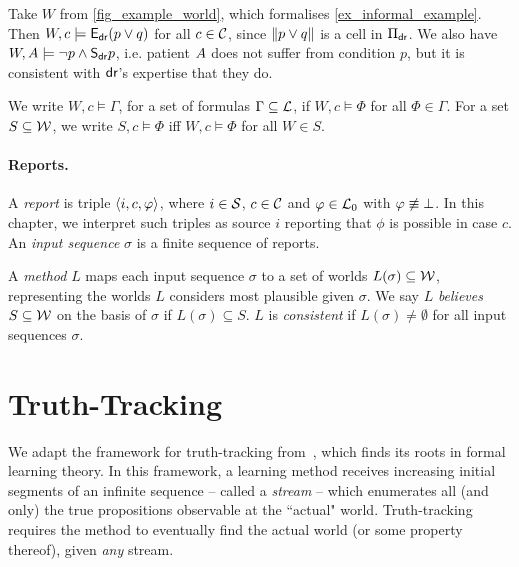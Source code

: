 \begin{example}
    \label{ex_semantics}
    Take $W$ from \cref{fig_example_world}, which formalises
    \cref{ex_informal_example}. Then $W, c \models \mathsf{E}_{\mathsf{dr}{}}(p \lor q)$ for
    all $c \in \mathcal{C}$, since $\|{p \lor q}\|$ is a cell in $\Pi_{\mathsf{dr}{}}$.
    We also have $W, A{} \models \neg{p} \land \mathsf{S}_{\mathsf{dr}{}}p$, i.e.
    patient $A{}$ does not suffer from condition $p$, but it is
    consistent with $\mathsf{dr}{}$'s expertise that they do.
\end{example}

We write $W, c \models \Gamma$, for a set of formulas $\Gamma \subseteq \mathcal{L}$, if
$W, c \models \Phi$ for all $\Phi \in \Gamma$. For a set $S \subseteq \mathcal{W}$,
we write $S, c \models \Phi$ iff $W, c \models \Phi$ for all $W \in S$.

\paragraph{Reports.}

A \emph{report} is triple $\langle {i, c, \varphi} \rangle$, where $i \in \mathcal{S}$, $c \in
\mathcal{C}$ and $\varphi \in \mathcal{L}_0$ with $\varphi \not\equiv \bot$. In this chapter, we
interpret such triples as source $i$ reporting that $\phi$ is possible in case
$c$. An \emph{input sequence} $\sigma$ is a finite sequence of reports.

A \emph{method} $L$ maps each input sequence $\sigma$ to a set of worlds
$L(\sigma) \subseteq \mathcal{W}$, representing the worlds $L$ considers most
plausible given $\sigma$.\footnotemark{} We say $L$ \emph{believes} $S
\subseteq \mathcal{W}$ on the basis of $\sigma$ if $L(\sigma) \subseteq S$. $L$ is
\emph{consistent} if $L(\sigma) \ne \emptyset$ for all input sequences
$\sigma$.


\section{Truth-Tracking}
\label{sec_truthtracking}

We adapt the framework for truth-tracking
from~\cite{Baltag_2016,baltag_tt_2019}, which finds its roots in
formal learning theory. In this framework, a learning method receives
increasing initial segments of an infinite sequence -- called a \emph{stream}
-- which enumerates all (and only) the true propositions observable at the
``actual" world. Truth-tracking requires the method to eventually find
the actual world (or some property thereof), given \emph{any} stream.

